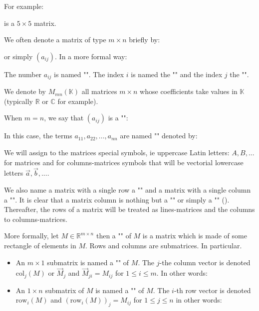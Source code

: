 	For example:
	
	is a $5\times 5$ matrix.
	
	We often denote a matrix of type $m\times n$ briefly by:
	
	or simply $(a_{ij})$. In a more formal way:
	
	
	The number $a_{ij}$ is named "". The index $i$ is named the "" and the index $j$ the "".
	
	We denote by $M_{mn}(\mathbb{K})$ all matrices $m\times n$ whose coefficients take values in $\mathbb{K}$ (typically $\mathbb{R}$ or $\mathbb{C}$ for example).
	
	When $m=n$, we say that $(a_{ij})$ is a "\label{square matrix}":
		
	In this case, the terms $a_{11},a_{22},...,a_{nn}$ are named "" denoted by: 
	
	
	We will assign to the matrices special symbols, ie uppercase Latin letters: $A, B, ...$ for matrices and for columns-matrices symbols that will be vectorial lowercase letters $\vec{a},\vec{b},...$.
	
	We also name a matrix with a single row a "" and a matrix with a single column a "". It is clear that a matrix column is nothing but a "" or simply a "" (). Thereafter, the rows of a matrix will be treated as lines-matrices and the columns to columns-matrices.
	
	More formally, let $M\in \mathbb{R}^{m\times n}$ then a "" of $M$ is a matrix which is made of some rectangle of elements in $M$. Rows and columns are submatrices. In particular.
	\begin{itemize}
		\item An  $m\times 1$ submatrix is named a "" of $M$. The $j$-the column vector is denoted $\text{col}_j(M)$ or $\vec{M}_j$ and $\vec{M}_{ji}=M_{ij}$ for $1\leq i\leq m$. In other words:
		
		
		\item An $1\times n$ submatrix of $M$ is named a "" of $M$. The $i$-th row vector is denoted $\text{row}_i(M)$ and $(\text{row}_i(M))_j=M_{ij}$ for $1\leq j\leq n$ in other words:
		
	\end{itemize}
	
